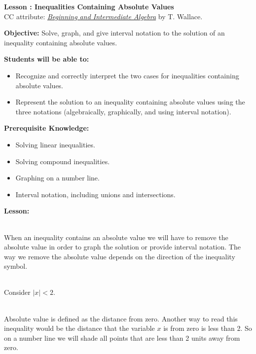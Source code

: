 \documentclass[12pt]{article}
\theoremstyle{definition}
\begin{document}
{\bf \large Lesson : Inequalities Containing Absolute Values}\label{les:inequalities_containing_absolute_values}
\\ CC attribute: \href{http://www.wallace.ccfaculty.org/book/book.html}{\it{Beginning and Intermediate Algebra}} by T. Wallace. 
\hfill \doclicenseImage[imagewidth=5em]\\
\par
{\bf Objective:} Solve, graph, and give interval notation to the solution of an inequality containing absolute values.\\
\par
{\bf Students will be able to:}
\begin{itemize}
	\item Recognize and correctly interpret the two cases for inequalities containing absolute values.
	\item Represent the solution to an inequality containing absolute values using the three notations (algebraically, graphically, and using interval notation).
\end{itemize}
{\bf Prerequisite Knowledge:}
\begin{itemize}
	\item Solving linear inequalities.
	\item Solving compound inequalities.
	\item Graphing on a number line.
	\item Interval notation, including unions and intersections.
\end{itemize}
\hrulefill

{\bf Lesson:}\\
\ \par
When an inequality contains an absolute value we will have to remove the absolute value in order to graph the solution or provide interval notation. The way we remove the absolute value depends on the direction of the inequality symbol.\\
\ \par
Consider $|x| < 2$.\\
\ \par
Absolute value is defined as the distance from zero. Another way to read this inequality would be the distance that the variable $x$ is from zero is less than 2. So on a number line we will shade all points that are less than 2 units away from zero.
\begin{center}
\end{center}
\end{document}
